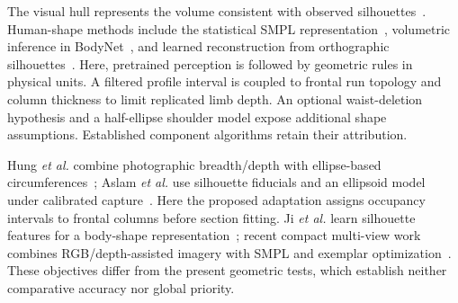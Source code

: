 \documentclass[11pt,a4paper]{article}
\begin{document}
The visual hull represents the volume consistent with observed silhouettes~\cite{laurentini1994visual}. Human-shape methods include the statistical SMPL representation~\cite{loper2015smpl}, volumetric inference in BodyNet~\cite{varol2018bodynet}, and learned reconstruction from orthographic silhouettes~\cite{ji2019}. Here, pretrained perception is followed by geometric rules in physical units. A filtered profile interval is coupled to frontal run topology and column thickness to limit replicated limb depth. An optional waist-deletion hypothesis and a half-ellipse shoulder model expose additional shape assumptions. Established component algorithms retain their attribution.

Hung \emph{et al.} combine photographic breadth/depth with ellipse-based circumferences~\cite{hung2004}; Aslam \emph{et al.} use silhouette fiducials and an ellipsoid model under calibrated capture~\cite{aslam2017}. Here the proposed adaptation assigns occupancy intervals to frontal columns before section fitting. Ji \emph{et al.} learn silhouette features for a body-shape representation~\cite{ji2019}; recent compact multi-view work combines RGB/depth-assisted imagery with SMPL and exemplar optimization~\cite{chen2025compact}. These objectives differ from the present geometric tests, which establish neither comparative accuracy nor global priority.
\end{document}
